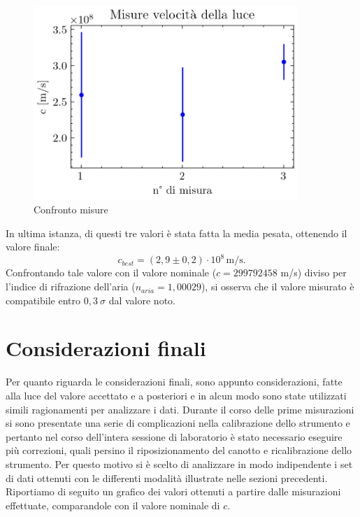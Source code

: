 \documentclass{article}
\begin{document}
        \begin{figure}[H]

            \centering
            \includegraphics[width=10cm]{../images/results.png}
            \caption{Confronto misure}

        \end{figure}

        In ultima istanza, di questi tre valori è stata fatta la media pesata, ottenendo il valore finale: 
        \[ c_{best} = (2,9 \pm 0,2)\cdot10^8 \, \mathrm{m/s}. \]
        Confrontando tale valore con il valore nominale ($ c = 299 792 458$ m/s) diviso per l'indice di rifrazione dell'aria ($ n_{aria} = 1,00029$), 
        si osserva che il valore misurato è compatibile entro $0,3 ~\sigma$ dal valore noto. 


    \section{Considerazioni finali}
        Per quanto riguarda le considerazioni finali, sono appunto considerazioni, fatte alla luce del valore accettato e a posteriori e in alcun modo sono state utilizzati simili ragionamenti per analizzare i dati. 
        Durante il corso delle prime misurazioni si sono presentate una serie di complicazioni nella calibrazione dello strumento e 
        pertanto nel corso dell'intera sessione di laboratorio è stato necessario eseguire più correzioni, quali persino il riposizionamento del canotto e 
        ricalibrazione dello strumento. Per questo motivo si è scelto di analizzare in modo indipendente i set di dati ottenuti con le differenti modalità illustrate 
        nelle sezioni precedenti. \\
        
        Riportiamo di seguito un grafico dei valori ottenuti a partire dalle misurazioni effettuate, comparandole con il valore nominale di $c$.
            
\end{document}
